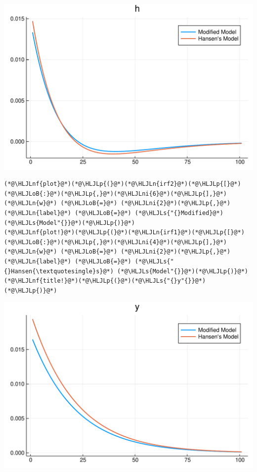 \documentclass[12pt,a4paper]{article}
\newcommand{\HLJLn}[1]{#1}
\newcommand{\HLJLnf}[1]{\textcolor[RGB]{66,102,213}{#1}}
\newcommand{\HLJLs}[1]{\textcolor[RGB]{201,61,57}{#1}}
\newcommand{\HLJLni}[1]{\textcolor[RGB]{59,151,46}{#1}}
\newcommand{\HLJLoB}[1]{\textcolor[RGB]{102,102,102}{\textbf{#1}}}
\newcommand{\HLJLp}[1]{#1}
\begin{document}
\includegraphics[width=\linewidth]{figures/yvan_7_1.pdf}

\begin{lstlisting}
(*@\HLJLnf{plot}@*)(*@\HLJLp{(}@*)(*@\HLJLn{irf2}@*)(*@\HLJLp{[}@*)(*@\HLJLoB{:}@*)(*@\HLJLp{,}@*)(*@\HLJLni{6}@*)(*@\HLJLp{],}@*) (*@\HLJLn{w}@*) (*@\HLJLoB{=}@*) (*@\HLJLni{2}@*)(*@\HLJLp{,}@*) (*@\HLJLn{label}@*) (*@\HLJLoB{=}@*) (*@\HLJLs{"{}Modified}@*) (*@\HLJLs{Model"{}}@*)(*@\HLJLp{)}@*)
(*@\HLJLnf{plot!}@*)(*@\HLJLp{(}@*)(*@\HLJLn{irf1}@*)(*@\HLJLp{[}@*)(*@\HLJLoB{:}@*)(*@\HLJLp{,}@*)(*@\HLJLni{4}@*)(*@\HLJLp{],}@*) (*@\HLJLn{w}@*) (*@\HLJLoB{=}@*) (*@\HLJLni{2}@*)(*@\HLJLp{,}@*) (*@\HLJLn{label}@*) (*@\HLJLoB{=}@*) (*@\HLJLs{"{}Hansen{\textquotesingle}s}@*) (*@\HLJLs{Model"{}}@*)(*@\HLJLp{)}@*)
(*@\HLJLnf{title!}@*)(*@\HLJLp{(}@*)(*@\HLJLs{"{}y"{}}@*)(*@\HLJLp{)}@*)
\end{lstlisting}

\includegraphics[width=\linewidth]{figures/yvan_8_1.pdf}
\end{document}
